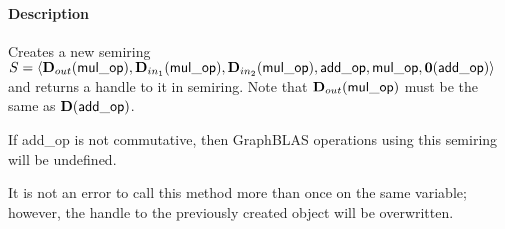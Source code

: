 \paragraph{Description}

Creates a new semiring $S = \langle \mbox{$\mathbf{D}_{out}$}({\sf mul\_op}), 
\mbox{$\mathbf{D}_{in_{1}}$}({\sf mul\_op}), \mbox{$\mathbf{D}_{in_{2}}$}({\sf mul\_op}), {\sf add\_op}, 
{\sf mul\_op}, \mathbf{0}({\sf add\_op})\rangle$ and returns a handle to it in 
{\sf semiring}.  Note that $\mbox{$\mathbf{D}_{out}$}({\sf mul\_op})$ must be the same as 
$\mathbf{D}({\sf add\_op})$.

If {\sf add\_op} is not commutative, then GraphBLAS operations using this semiring
will be undefined.

It is not an error to call this method more than once on the same variable;  
however, the handle to the previously created object will be overwritten. 
